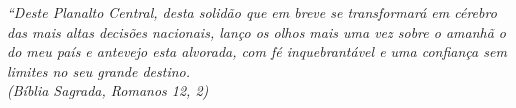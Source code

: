 \begin{epigrafe}
    \vspace*{\fill}
	\begin{flushright}
		\textit{``Deste Planalto Central, desta solidão que em breve se transformará em cérebro das mais altas decisões nacionais, lanço os olhos mais uma vez sobre o amanhã o do meu país e antevejo esta alvorada, com fé inquebrantável e uma confiança sem limites no seu grande destino.\\
		(Bíblia Sagrada, Romanos 12, 2)}
	\end{flushright}
\end{epigrafe}
